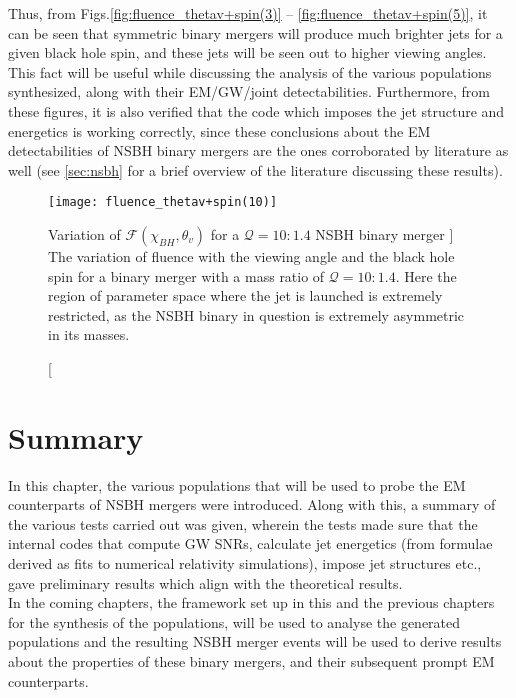     Thus, from Figs.\ref{fig:fluence_thetav+spin(3)} --
    \ref{fig:fluence_thetav+spin(5)}, it can be seen that symmetric binary mergers will
    produce much brighter jets for a given black hole spin, and these jets will be seen
    out to higher viewing angles. This fact will be useful while discussing the analysis
    of the various populations synthesized, along with their EM/GW/joint
    detectabilities.  Furthermore, from these figures, it is also verified that the code
    which imposes the jet structure and energetics is working correctly, since these
    conclusions about the EM detectabilities of NSBH binary mergers are the ones
    corroborated by literature as well (see \ref{sec:nsbh} for a brief overview of the
    literature discussing these results).

    \begin{figure}[ht]
        \centering
        \texttt{[image: fluence\_thetav+spin(10)]}
        \caption
        [
            Variation of $\mathcal{F}(\chi_{BH}, \theta_{v})$ for a $\mathcal{Q}=10:1.4$
            NSBH binary merger
        ]
        {
            The variation of fluence with the viewing angle and the black hole spin for
            a binary merger with a mass ratio of $\mathcal{Q}=10:1.4$. Here the region
            of parameter space where the jet is launched is extremely restricted, as the
            NSBH binary in question is extremely asymmetric in its masses.
        }
        \label{fig:fluence_thetav+spin(10)}
    \end{figure}

\section{Summary}

    In this chapter, the various populations that will be used to probe the EM
    counterparts of NSBH mergers were introduced. Along with this, a summary of the
    various tests carried out was given, wherein the tests made sure that the internal
    codes that compute GW SNRs, calculate jet energetics (from formulae derived as fits
    to numerical relativity simulations), impose jet structures etc., gave preliminary
    results which align with the theoretical results.\\
    In the coming chapters, the framework set up in this and the previous chapters for
    the synthesis of the populations, will be used to analyse the generated populations
    and the resulting NSBH merger events will be used to derive results about the
    properties of these binary mergers, and their subsequent prompt EM counterparts.
